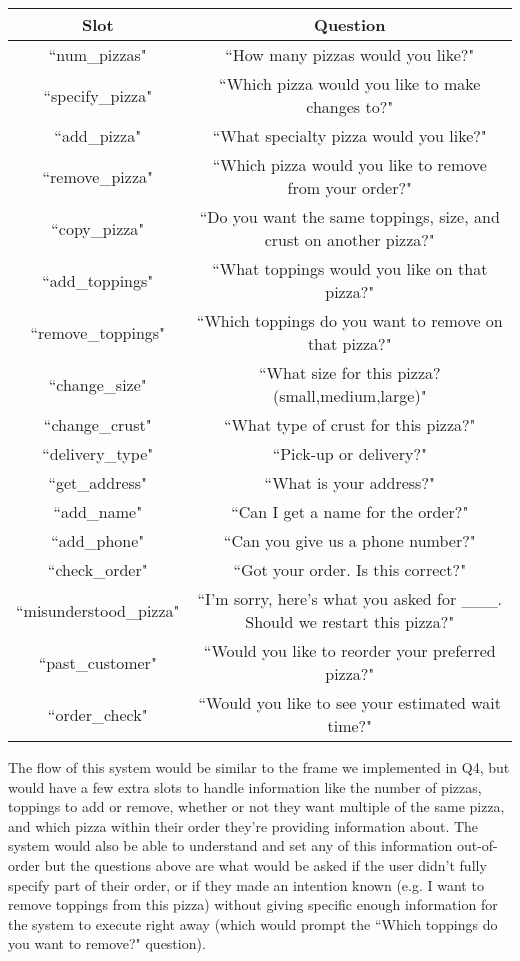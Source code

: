 \documentclass{article}
\begin{document}
\begin{tabular}{|c|c|}
\hline
Slot & Question \\\hline
``num\_pizzas" & ``How many pizzas would you like?"\\\hline
``specify\_pizza" & ``Which pizza would you like to make changes to?"\\\hline
``add\_pizza" & ``What specialty pizza would you like?"\\\hline
``remove\_pizza" & ``Which pizza would you like to remove from your order?"\\\hline
``copy\_pizza" & ``Do you want the same toppings, size, and crust on another pizza?"\\\hline
``add\_toppings" & ``What toppings would you like on that pizza?"\\\hline
``remove\_toppings" & ``Which toppings do you want to remove on that pizza?"\\\hline
``change\_size" & ``What size for this pizza? (small,medium,large)"\\\hline
``change\_crust" & ``What type of crust for this pizza?"\\\hline
``delivery\_type" & ``Pick-up or delivery?"\\\hline
``get\_address" & ``What is your address?"\\\hline
``add\_name" & ``Can I get a name for the order?"\\\hline
``add\_phone" & ``Can you give us a phone number?"\\\hline
``check\_order" & ``Got your order. Is this correct?"\\\hline
``misunderstood\_pizza" & ``I'm sorry, here's what you asked for \_\_\_. Should we restart this pizza?"\\\hline
``past\_customer" & ``Would you like to reorder your preferred pizza?"\\\hline
``order\_check" & ``Would you like to see your estimated wait time?"\\\hline
\end{tabular}

\vspace{.5cm}

The flow of this system would be similar to the frame we implemented in Q4, but would have a few extra slots to handle information like the number of pizzas, toppings to add or remove, whether or not they want multiple of the same pizza, and which pizza within their order they're providing information about. The system would also be able to understand and set any of this information out-of-order but the questions above are what would be asked if the user didn't fully specify part of their order, or if they made an intention known (e.g. I want to remove toppings from this pizza) without giving specific enough information for the system to execute right away (which would prompt the ``Which toppings do you want to remove?" question). 
\end{document}

